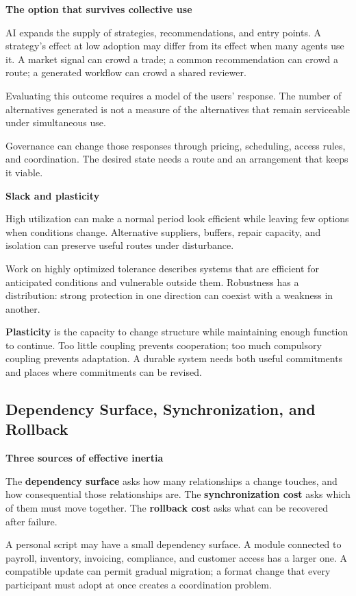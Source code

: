 \documentclass[11pt,openany]{book}
\newcommand{\term}[1]{\textbf{#1}}
\newcommand{\subhead}[1]{\par\medskip\noindent\textbf{#1}\par\nobreak\smallskip}
\begin{document}
\subhead{The option that survives collective use}

AI expands the supply of strategies, recommendations, and entry points. A strategy's effect at low adoption may differ from its effect when many agents use it. A market signal can crowd a trade; a common recommendation can crowd a route; a generated workflow can crowd a shared reviewer.

Evaluating this outcome requires a model of the users' response. The number of alternatives generated is not a measure of the alternatives that remain serviceable under simultaneous use.

Governance can change those responses through pricing, scheduling, access rules, and coordination. The desired state needs a route and an arrangement that keeps it viable.

\subhead{Slack and plasticity}

High utilization can make a normal period look efficient while leaving few options when conditions change. Alternative suppliers, buffers, repair capacity, and isolation can preserve useful routes under disturbance.

Work on highly optimized tolerance describes systems that are efficient for anticipated conditions and vulnerable outside them.\cite{carlson1999highly} Robustness has a distribution: strong protection in one direction can coexist with a weakness in another.

\term{Plasticity} is the capacity to change structure while maintaining enough function to continue. Too little coupling prevents cooperation; too much compulsory coupling prevents adaptation. A durable system needs both useful commitments and places where commitments can be revised.

\subsection{Dependency Surface, Synchronization, and Rollback}

\subhead{Three sources of effective inertia}

The \term{dependency surface} asks how many relationships a change touches, and how consequential those relationships are. The \term{synchronization cost} asks which of them must move together. The \term{rollback cost} asks what can be recovered after failure.

A personal script may have a small dependency surface. A module connected to payroll, inventory, invoicing, compliance, and customer access has a larger one. A compatible update can permit gradual migration; a format change that every participant must adopt at once creates a coordination problem.
\end{document}
